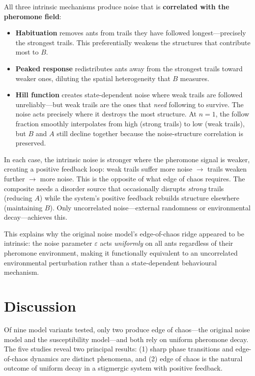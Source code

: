 \documentclass[11pt,a4paper]{article}
\begin{document}
All three intrinsic mechanisms produce noise that is \textbf{correlated with the pheromone field}:
\begin{itemize}
  \item \textbf{Habituation} removes ants from trails they have followed longest---precisely the strongest trails.
    This preferentially weakens the structures that contribute most to $B$.
  \item \textbf{Peaked response} redistributes ants away from the strongest trails toward weaker ones, diluting the spatial heterogeneity that $B$ measures.
  \item \textbf{Hill function} creates state-dependent noise where weak trails are followed unreliably---but weak trails are the ones that \emph{need} following to survive.
    The noise acts precisely where it destroys the most structure.
    At $n = 1$, the follow fraction smoothly interpolates from high (strong trails) to low (weak trails), but $B$ and $A$ still decline together because the noise-structure correlation is preserved.
\end{itemize}

In each case, the intrinsic noise is stronger where the pheromone signal is weaker, creating a positive feedback loop: weak trails suffer more noise $\to$ trails weaken further $\to$ more noise.
This is the opposite of what edge of chaos requires.
The composite needs a disorder source that occasionally disrupts \emph{strong} trails (reducing $A$) while the system's positive feedback rebuilds structure elsewhere (maintaining $B$).
Only uncorrelated noise---external randomness or environmental decay---achieves this.

This explains why the original noise model's edge-of-chaos ridge appeared to be intrinsic: the noise parameter $\varepsilon$ acts \emph{uniformly} on all ants regardless of their pheromone environment, making it functionally equivalent to an uncorrelated environmental perturbation rather than a state-dependent behavioural mechanism.

\section{Discussion}

Of nine model variants tested, only two produce edge of chaos---the original noise model and the susceptibility model---and both rely on uniform pheromone decay.
The five studies reveal two principal results: (1) sharp phase transitions and edge-of-chaos dynamics are distinct phenomena, and (2) edge of chaos is the natural outcome of uniform decay in a stigmergic system with positive feedback.
\end{document}
